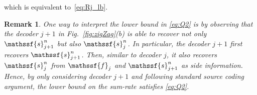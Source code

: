 \documentclass[journal, twocolumn, 10pt]{IEEEtran}
\newtheorem{remark}{Remark}
\newtheorem{lemma}{Lemma}
\newcommand{\cF}{{\mathcal{F}}}
\newcommand{\cG}{{\mathcal{G}}}
\newcommand{\eps}{\varepsilon}
\newcommand{\rvf}{{\mathssf{f}}}    %
\newcommand{\rvs}{{\mathssf{s}}}    %
\begin{document}
which is equivalent to~\eqref{eq:Rj_lb}. 
\begin{remark}
\label{rem:suc}
One way to interpret the lower bound in \eqref{eq:Q2} is by observing that the decoder $j+1$ in Fig.~\ref{fig:zigZag}(b) is able to recover not only $\rvs_{j+1}^n$ but also $\rvs_{j}^n$. In particular, the decoder $j+1$ first recovers ${\rvs}^n_{j+1}$. Then, similar to decoder $j$, it also recovers $\rvs_{j}^n$ from $\rvf_{j}$ and ${\rvs}^n_{j+1}$ as side information. Hence, by only considering decoder $j+1$ and following standard source coding argument, the lower bound on the sum-rate satisfies \eqref{eq:Q2}.
 
\end{remark}
%
%
\end{document}
